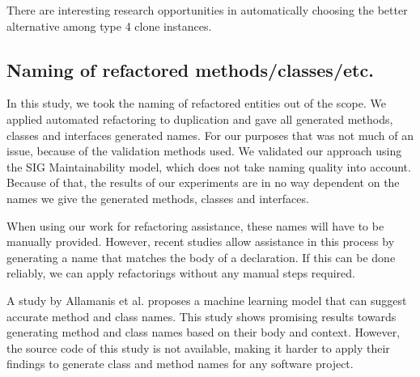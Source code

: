 There are interesting research opportunities in automatically choosing the better alternative among type 4 clone instances.


\subsection{Naming of refactored methods/classes/etc.}
In this study, we took the naming of refactored entities out of the scope. We applied automated refactoring to duplication and gave all generated methods, classes and interfaces generated names. For our purposes that was not much of an issue, because of the validation methods used. We validated our approach using the SIG Maintainability model, which does not take naming quality into account. Because of that, the results of our experiments are in no way dependent on the names we give the generated methods, classes and interfaces.

When using our work for refactoring assistance, these names will have to be manually provided. However, recent studies allow assistance in this process by generating a name that matches the body of a declaration. If this can be done reliably, we can apply refactorings without any manual steps required.

A study by Allamanis et al. \cite{allamanis2015suggesting} proposes a machine learning model that can suggest accurate method and class names. This study shows promising results towards generating method and class names based on their body and context. However, the source code of this study is not available, making it harder to apply their findings to generate class and method names for any software project.

